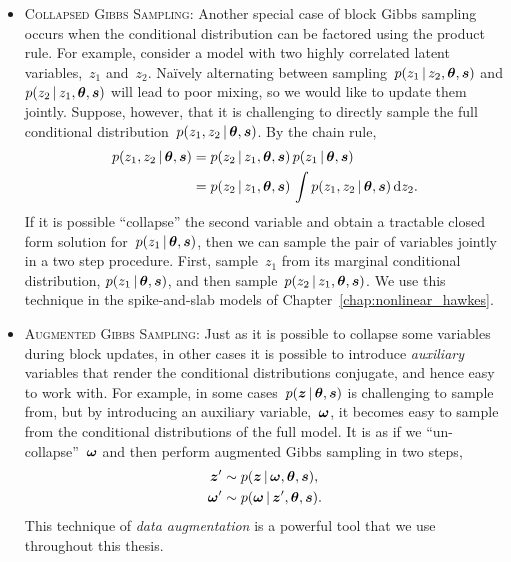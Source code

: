 \begin{itemize}
\item \textsc{Collapsed Gibbs Sampling}: Another special case of block
  Gibbs sampling occurs when the conditional distribution can be
  factored using the product rule. For example, consider a model with
  two highly correlated latent variables,~$z_1$ and~$z_2$.  Na\"ively
  alternating between sampling~${p(z_1 \,|\, z_2, \boldsymbol{\theta}, \boldsymbol{s})}$ and
  ${p(z_2 \,|\, z_1, \boldsymbol{\theta}, \boldsymbol{s})}$ will lead to poor mixing, so we
  would like to update them jointly.  Suppose, however, that it is
  challenging to directly sample the full conditional
  distribution~$p(z_1, z_2 \,|\, \boldsymbol{\theta}, \boldsymbol{s})$. By the chain rule,
  \begin{align*}
    p(z_1, z_2 \,|\, \boldsymbol{\theta}, \boldsymbol{s}) 
    &= p(z_2 \,|\, z_1, \boldsymbol{\theta}, \boldsymbol{s}) \, 
      p(z_1 \,|\, \boldsymbol{\theta}, \boldsymbol{s}) \\
    &= p(z_2 \,|\, z_1, \boldsymbol{\theta}, \boldsymbol{s}) \, 
      \int p(z_1, z_2 \,|\, \boldsymbol{\theta}, \boldsymbol{s}) \, \mathrm{d}z_2.
  \end{align*}
  If it is possible ``collapse'' the second variable and obtain a
  tractable closed form solution for~$p(z_1 \,|\, \boldsymbol{\theta}, \boldsymbol{s})$,
  then we can sample the pair of variables jointly in a two step
  procedure. First, sample~$z_1$ from its marginal conditional
  distribution, $p(z_1 \,|\, \boldsymbol{\theta}, \boldsymbol{s})$, and then
  sample~${p(z_2 \,|\, z_1, \boldsymbol{\theta}, \boldsymbol{s})}$. We use this technique 
  in the spike-and-slab models of Chapter~\ref{chap:nonlinear_hawkes}.
  
\item \textsc{Augmented Gibbs Sampling}: Just as it is possible to
  collapse some variables during block updates, in other cases it is
  possible to introduce \emph{auxiliary} variables that render the
  conditional distributions conjugate, and hence easy to work
  with. For example, in some cases~$p(\boldsymbol{z} \,|\, \boldsymbol{\theta}, \boldsymbol{s})$ is
  challenging to sample from, but by introducing an auxiliary
  variable,~$\boldsymbol{\omega}$, it becomes easy to sample from the conditional
  distributions of the full model. It is as if we ``un-collapse''~$\boldsymbol{\omega}$
  and then perform augmented Gibbs sampling in two steps,
  \begin{align*}
    \boldsymbol{z}' &\sim p(\boldsymbol{z} \,|\, \boldsymbol{\omega}, \boldsymbol{\theta}, \boldsymbol{s}), \\
    \boldsymbol{\omega}' &\sim p(\boldsymbol{\omega} \,|\, \boldsymbol{z}', \boldsymbol{\theta}, \boldsymbol{s}).
  \end{align*}
  This technique of \emph{data augmentation} is a powerful tool that we use 
  throughout this thesis.
\end{itemize}


